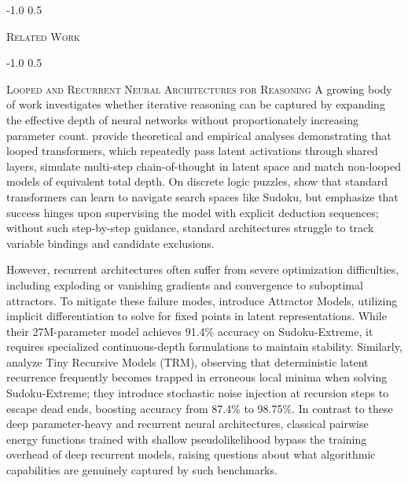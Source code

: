 \documentclass{article} %
\makeatletter
\renewcommand{\section}{\@startsection{section}{1}{\z@}%
  {-1.0\baselineskip}%
  {0.5\baselineskip}%
  {\normalfont\fontsize{12}{14}\selectfont\raggedright\scshape}}
\renewcommand{\subsection}{\@startsection{subsection}{2}{\z@}%
  {-1.0\baselineskip}%
  {0.5\baselineskip}%
  {\normalfont\fontsize{10}{11}\selectfont\raggedright\scshape}}
\makeatother
\begin{document}
\section{\textsc{Related Work}}
\label{sec:related_work}

\subsection{\textsc{Looped and Recurrent Neural Architectures for Reasoning}}
A growing body of work investigates whether iterative reasoning can be captured by expanding the effective depth of neural networks without proportionately increasing parameter count. \citet{Saunshi2025ReasoningLatent} provide theoretical and empirical analyses demonstrating that looped transformers, which repeatedly pass latent activations through shared layers, simulate multi-step chain-of-thought in latent space and match non-looped models of equivalent total depth. On discrete logic puzzles, \citet{Shah2024CausalLanguage} show that standard transformers can learn to navigate search spaces like Sudoku, but emphasize that success hinges upon supervising the model with explicit deduction sequences; without such step-by-step guidance, standard architectures struggle to track variable bindings and candidate exclusions.

However, recurrent architectures often suffer from severe optimization difficulties, including exploding or vanishing gradients and convergence to suboptimal attractors. To mitigate these failure modes, \citet{Feinashley2026SolveLoop} introduce Attractor Models, utilizing implicit differentiation to solve for fixed points in latent representations. While their 27M-parameter model achieves 91.4\% accuracy on Sudoku-Extreme, it requires specialized continuous-depth formulations to maintain stability. Similarly, \citet{Sghaier2026ProbabilisticTiny} analyze Tiny Recursive Models (TRM), observing that deterministic latent recurrence frequently becomes trapped in erroneous local minima when solving Sudoku-Extreme; they introduce stochastic noise injection at recursion steps to escape dead ends, boosting accuracy from 87.4\% to 98.75\%. In contrast to these deep parameter-heavy and recurrent neural architectures, classical pairwise energy functions trained with shallow pseudolikelihood bypass the training overhead of deep recurrent models, raising questions about what algorithmic capabilities are genuinely captured by such benchmarks.
\end{document}
